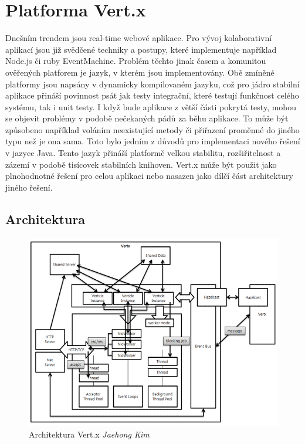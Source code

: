 
\chapter{Platforma Vert.x}

Dnešním trendem jsou real-time webové aplikace. Pro vývoj kolaborativní aplikací jsou již svědčené techniky a postupy, které implementuje například Node.js či ruby EventMachine. Problém těchto jinak časem a komunitou ověřených platforem je jazyk, v kterém jsou implementovány. Obě zmíněné platformy jsou napsány v dynamicky kompilovaném jazyku, což pro jádro stabilní aplikace přináší povinnost psát jak testy integrační, které testují funkčnost celého systému, tak i unit testy. 
I když bude aplikace z větší části pokrytá testy, mohou se objevit problémy v podobě nečekaných pádů za běhu aplikace. To může být způsobeno například voláním neexistující metody či přiřazení proměnné do jiného typu než je ona sama. Toto bylo jedním z důvodů pro implementaci nového řešení v jazyce Java. Tento jazyk přináší platformě velkou stabilitu, rozšiřitelnost a zázemí v podobě tisícovek stabilních knihoven. Vert.x může být použit jako plnohodnotné řešení pro celou aplikaci nebo nasazen jako dílčí část architektury jiného řešení.

\section{Architektura}

\begin{figure}
\begin{centering}
\includegraphics[width=1\textwidth]{obrazky/vertx-architecture-diagram}
\par\end{centering}
\caption{Architektura Vert.x \emph{Jaehong Kim} \label{fig:vertxArchitectureDiagram}}
\end{figure}

